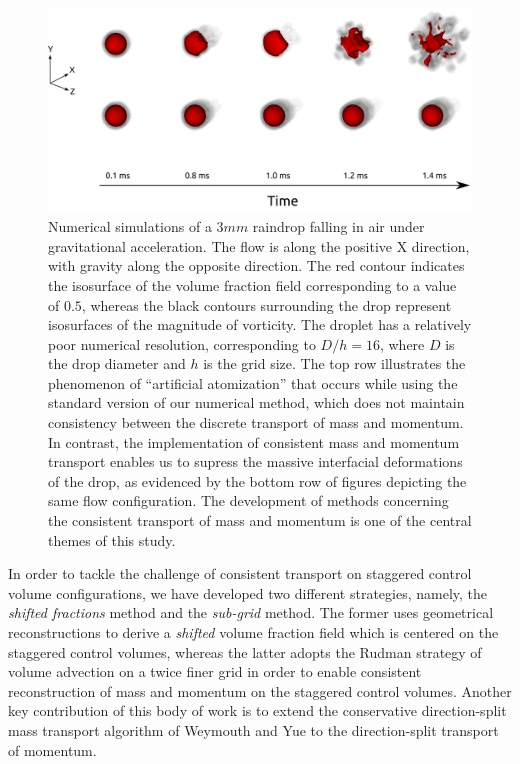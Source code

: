 \begin{figure}[h!]
\begin{center}
\includegraphics{plots/raindrop/raindrop_explode.png}
\end{center}
\caption{Numerical simulations of a $3 mm$ raindrop falling in air under gravitational acceleration.
	The flow is along the positive X direction, with gravity along the opposite direction. 
	The red contour indicates the isosurface of the volume fraction 
	field corresponding to a value of $0.5$, whereas the black contours 
	surrounding the drop represent isosurfaces of the magnitude of vorticity.
	The droplet has a relatively poor numerical resolution, corresponding to $D/h = 16$,
	where $D$ is the drop diameter and $h$ is the grid size.
	The top row illustrates the phenomenon of ``artificial atomization'' that occurs
	while using the standard version of our numerical method, which does not maintain
	consistency between the discrete transport of mass and momentum.
	In contrast, the implementation of consistent mass and momentum transport
	enables us to supress the massive interfacial deformations of the drop, 
	as evidenced by the bottom row of figures depicting the same flow configuration. 
	The development of methods concerning the consistent transport of mass and momentum 
	is one of the central themes of this study.
	}
	\label{explode_compare}
\end{figure}

In order to tackle the challenge of consistent transport on staggered control 
volume configurations, we have developed two different strategies, namely, 
the \textit{shifted fractions} method and the \textit{sub-grid} method. 
The former uses geometrical reconstructions to derive a 
\textit{shifted} volume fraction field which is centered on the staggered
control volumes, whereas the latter adopts the Rudman \cite{rudman1998volume} 
strategy of volume advection on a twice finer grid in order to 
enable consistent reconstruction of mass and momentum on the staggered control volumes. 
Another key contribution of this body of work is to extend the conservative 
direction-split mass transport algorithm of Weymouth and Yue  
to the direction-split transport of momentum. 

